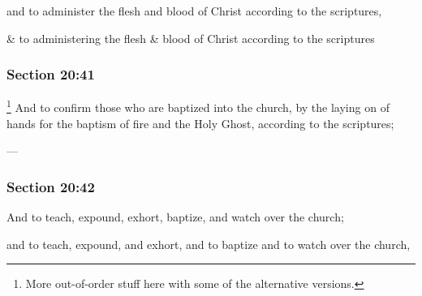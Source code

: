 		\begin{framed}
		\scriptsize
			\begin{compactdesc}
				\item[JSP] and to administer the flesh and blood of Christ according to the scriptures, 
				\item[RB1] \& to administering the flesh \& blood of Christ according to the scriptures
			\end{compactdesc}
		\end{framed}

	\subsubsection{Section 20:41} %
		\label{DC20-41}

			\footnote{%
				More out-of-order stuff here with some of the alternative versions.
				}%
		And to confirm those who are baptized into the church, by the laying on of hands for the baptism of fire and the Holy Ghost, according to the scriptures;

		\begin{framed}
		\scriptsize
			\begin{compactdesc}
				\item[JSP] ---
				\item[RB1] 
				\item[BC] 
			\end{compactdesc}
		\end{framed}

	\subsubsection{Section 20:42} %
		\label{DC20-42}

		And to teach, expound, exhort, baptize, and watch over the church;

		\begin{framed}
		\scriptsize
			\begin{compactdesc}
				\item[JSP] and to teach, expound, and exhort, and to baptize and to watch over the church,
				\item[RB1] 
				\item[BC] 
			\end{compactdesc}
		\end{framed}

